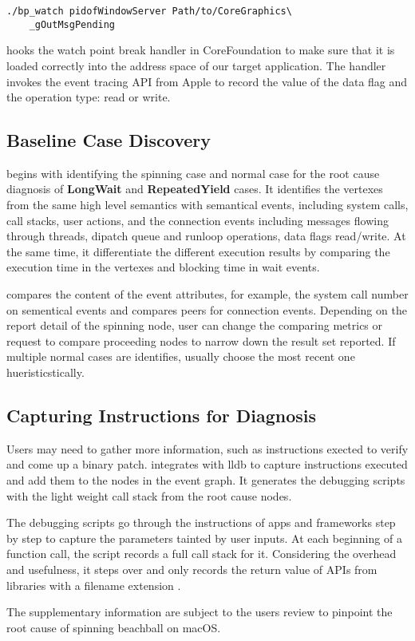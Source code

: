 \begin{lstlisting}
./bp_watch pidofWindowServer Path/to/CoreGraphics\
	_gOutMsgPending
\end{lstlisting}

\xxx hooks the watch point break handler in CoreFoundation to make sure that it is
loaded correctly into the address space of our target application. The handler
invokes the event tracing API from Apple to record the value of the data flag
and the operation type: read or write.

\subsection{Baseline Case Discovery }

\xxx begins with identifying the spinning case and normal case for the root
cause diagnosis of \textbf{LongWait} and \textbf{RepeatedYield} cases. It
identifies the vertexes from the same high level semantics with semantical
events, including system calls, call stacks, user actions, and the connection
events including messages flowing through threads, dipatch queue and runloop
operations, data flags read/write. At the same time, it differentiate the
different execution results by comparing the execution time in the vertexes and
blocking time in wait events.

\xxx compares the content of the event attributes, for example, the system call
number on sementical events and compares peers for connection events. Depending
on the report detail of the spinning node, user can change the comparing metrics
or request \xxx to compare proceeding nodes to narrow down the result set
reported. If multiple normal cases are identifies, \xxx usually choose the most
recent one hueristicstically.

\subsection{Capturing Instructions for Diagnosis}

Users may need to gather more information, such as instructions exected to
verify and come up a binary patch. \xxx integrates with lldb to capture
instructions executed and add them to the nodes in the event graph. It generates
the debugging scripts with the light weight call stack from the root cause
nodes.

The debugging scripts go through the instructions of apps and frameworks step
by step to capture the parameters tainted by user inputs. At each beginning of
a function call, the script records a full call stack for it. Considering the
overhead and usefulness, it steps over and only records the return value of APIs
from libraries with a filename extension \vv{.dylib}.

The supplementary information are subject to the users review to pinpoint the
root cause of spinning beachball on macOS.

